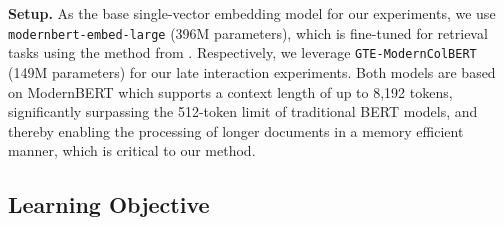 \noindent\textbf{Setup.}
As the base single-vector embedding model for our experiments, we use \texttt{modernbert-embed-large}  (396M parameters), which is fine-tuned for retrieval tasks using the method from \cite{nussbaum2024nomic}.
Respectively, we leverage \texttt{GTE-ModernColBERT}  (149M parameters) for our late interaction experiments. Both models are based on ModernBERT  which supports a context length of up to 8,192 tokens, significantly surpassing the 512-token limit of traditional BERT models, and thereby enabling the processing of longer documents in a memory efficient manner, which is critical to our method.




\subsection{Learning Objective}

